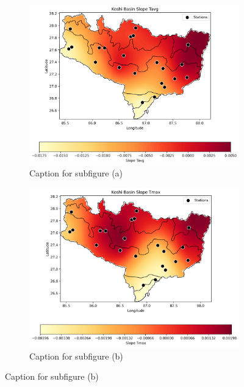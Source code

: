 \documentclass{article}
\begin{document}
\begin{figure}[htbp]
    \centering
    \begin{subfigure}{0.45\textwidth}
        \centering
        \includegraphics[width=\linewidth]{figure1.png}
        \caption{Caption for subfigure (a)}
        \label{fig:7a}
    \end{subfigure}
    \hfill
    \begin{subfigure}{0.45\textwidth}
        \centering
        \includegraphics[width=\linewidth]{figure2.png}
        \caption{Caption for subfigure (b)}
        \label{fig:7b}
    \end{subfigure}
    
    \vspace{0.5cm} %
    

\end{figure}
\end{document}
